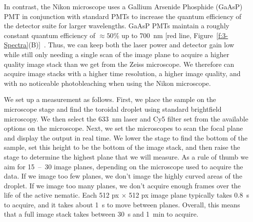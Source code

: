 In contrast, the Nikon microscope uses a Gallium Arsenide Phosphide (GaAsP) PMT in conjunction with standard PMTs to increase the quantum efficiency of the detector suite for larger wavelengths.
GaAsP PMTs maintain a roughly constant quantum efficiency of $\approx 50$\% up to 700~nm [red line, Figure~\ref{f:3-Spectra}(B)]~\cite{RN263}.
Thus, we can keep both the laser power and detector gain low while still only needing a single scan of the image plane to acquire a higher quality image stack than we get from the Zeiss microscope.
We therefore can acquire image stacks with a higher time resolution, a higher image quality, and with no noticeable photobleaching when using the Nikon microscope.

We set up a measurement as follows.
First, we place the sample on the microscope stage and find the toroidal droplet using standard brightfield microscopy.
We then select the 633~nm laser and Cy5 filter set from the available options on the microscope.
Next, we set the microscopes to scan the focal plane and display the output in real time.
We lower the stage to find the bottom of the sample, set this height to be the bottom of the image stack, and then raise the stage to determine the highest plane that we will measure.
As a rule of thumb we aim for 15~--~30 image planes, depending on the microscope used to acquire the data.
If we image too few planes, we don't image the highly curved areas of the droplet.
If we image too many planes, we don't acquire enough frames over the life of the active nematic.
Each 512 px $\times$ 512 px image plane typically takes 0.8~s to acquire, and it takes about 1~s to move between planes.
Overall, this means that a full image stack takes between 30~s and 1~min to acquire.

